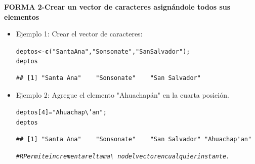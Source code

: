 \documentclass[12pt,letterpaper]{article}\usepackage[]{graphicx}\usepackage[]{color}
\makeatletter
\newcommand{\hlnum}[1]{\textcolor[rgb]{0.686,0.059,0.569}{#1}}%
\newcommand{\hlstr}[1]{\textcolor[rgb]{0.192,0.494,0.8}{#1}}%
\newcommand{\hlcom}[1]{\textcolor[rgb]{0.678,0.584,0.686}{\textit{#1}}}%
\newcommand{\hlstd}[1]{\textcolor[rgb]{0.345,0.345,0.345}{#1}}%
\newcommand{\hlkwb}[1]{\textcolor[rgb]{0.69,0.353,0.396}{#1}}%
\newcommand{\hlkwd}[1]{\textcolor[rgb]{0.737,0.353,0.396}{\textbf{#1}}}%
\newenvironment{kframe}{%
 \def\at@end@of@kframe{}%
 \ifinner\ifhmode%
  \def\at@end@of@kframe{\end{minipage}}%
  \begin{minipage}{\columnwidth}%
 \fi\fi%
 \def\FrameCommand##1{\hskip\@totalleftmargin \hskip-\fboxsep
 \colorbox{shadecolor}{##1}\hskip-\fboxsep
     \hskip-\linewidth \hskip-\@totalleftmargin \hskip\columnwidth}%
 \MakeFramed {\advance\hsize-\width
   \@totalleftmargin\z@ \linewidth\hsize
   \@setminipage}}%
 {\par\unskip\endMakeFramed%
 \at@end@of@kframe}
\newenvironment{knitrout}{}{} %
\makeatother
\begin{document}
\textbf {FORMA 2-Crear un vector de caracteres asign\'andole todos sus elementos}
\begin{itemize}
\item Ejemplo 1: Crear el vector de caracteres:
\begin{knitrout}
\color{fgcolor}\begin{kframe}
\begin{alltt}
\hlstd{deptos} \hlkwb{<-} \hlkwd{c}\hlstd{(}\hlstr{"Santa Ana"}\hlstd{,} \hlstr{"Sonsonate"}\hlstd{,} \hlstr{"San Salvador"}\hlstd{);}
\hlstd{deptos}
\end{alltt}
\begin{verbatim}
## [1] "Santa Ana"    "Sonsonate"    "San Salvador"
\end{verbatim}
\end{kframe}
\end{knitrout}
\item Ejemplo 2: Agregue el elemento "Ahuachap\'an" en la cuarta posici\'on.
\begin{knitrout}
\color{fgcolor}\begin{kframe}
\begin{alltt}
\hlstd{deptos[}\hlnum{4}\hlstd{]}\hlkwb{=}\hlstr{"Ahuachap\textbackslash{}'an"}\hlstd{;}
\hlstd{deptos}
\end{alltt}
\begin{verbatim}
## [1] "Santa Ana"    "Sonsonate"    "San Salvador" "Ahuachap'an"
\end{verbatim}
\begin{alltt}
\hlcom{# R Permite incrementar el tama\textbackslash{}~no del vector en cualquier instante.}
\end{alltt}
\end{kframe}
\end{knitrout}
\end{itemize}
\end{document}
